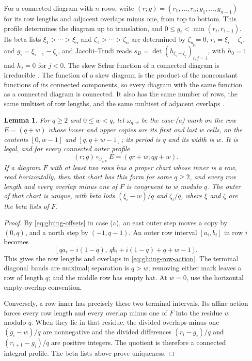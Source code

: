 \documentclass[11pt,a4paper]{amsart}
\numberwithin{equation}{section}
\theoremstyle{plain}
\newtheorem{lemma}[theorem]{Lemma}
\theoremstyle{definition}
\begin{document}
For a connected diagram with \(n\) rows, write \((r;g)=(r_1,\ldots,r_n;g_1,\ldots,g_{n-1})\) for its row lengths and adjacent overlaps minus one, from top to bottom.  This profile determines the diagram up to translation, and \(0\le g_i<\min(r_i,r_{i+1})\).  Its beta lists \(\xi_1>\cdots>\xi_n\) and \(\zeta_1>\cdots>\zeta_n\) are determined by \(\zeta_n=0\), \(r_i=\xi_i-\zeta_i\), and \(g_i=\xi_{i+1}-\zeta_i\), and Jacobi--Trudi reads \(s_D=\det(h_{\xi_i-\zeta_j})_{i,j=1}^n\), with \(h_0=1\) and \(h_j=0\) for \(j<0\).  The skew Schur function of a connected diagram is irreducible \cite[Thm.~1]{Barekat2009CoincidencesCorrigendum}.  The function of a skew diagram is the product of the nonconstant functions of its connected components, so every diagram with the same function as a connected diagram is connected.  It also has the same number of rows, the same multiset of row lengths, and the same multiset of adjacent overlaps \cite[Cor.~8.11]{Reiner2007Coincidences}.

\begin{lemma}\label{lem:gluing-row-action}
For \(q\ge2\) and \(0\le w<q\), let \(\omega_{q,w}\) be the case-(a) mark on the row \(E=(q+w)\) whose lower and upper copies are its first and last \(w\) cells, on the contents \([0,w-1]\) and \([q,q+w-1]\); its period is \(q\) and its width is \(w\).  It is legal, and for every connected outer profile
\begin{equation}\label{eq:gluing-row-action}
 (r;g)\circ_{\omega_{q,w}}E=(qr+w;qg+w).
\end{equation}
If a diagram \(F\) with at least two rows has a proper chart whose inner is a row, read horizontally, then that chart has this form for some \(q\ge2\), and every row length and every overlap minus one of \(F\) is congruent to \(w\) modulo \(q\).  The outer of that chart is unique, with beta lists \((\xi_i-w)/q\) and \(\zeta_i/q\), where \(\xi\) and \(\zeta\) are the beta lists of \(F\).
\end{lemma}
\begin{proof}
By \eqref{eq:gluing-offsets} in case (a), an east outer step moves a copy by \((0,q)\), and a north step by \((-1,q-1)\).  An outer row interval \([a_i,b_i]\) in row \(i\) becomes
\[
 [qa_i+i(1-q),\ qb_i+i(1-q)+q+w-1].
\]
This gives the row lengths and overlaps in \eqref{eq:gluing-row-action}.  The terminal diagonal bands are maximal; separation is \(q>w\); removing either mark leaves a row of length \(q\); and the middle row has empty hat.  At \(w=0\), use the horizontal empty-overlap convention.

Conversely, a row inner has precisely these two terminal intervals.  Its affine action forces every row length and every overlap minus one of \(F\) into the residue \(w\) modulo \(q\).  When they lie in that residue, the divided overlaps minus one \((g_i-w)/q\) are nonnegative and the divided differences \((r_i-g_i)/q\) and \((r_{i+1}-g_i)/q\) are positive integers.  The quotient is therefore a connected integral profile.  The beta lists above prove uniqueness.
\end{proof}
\end{document}
